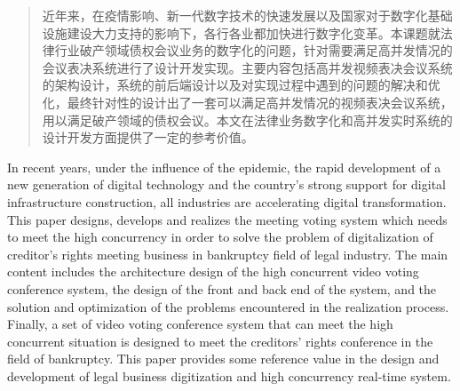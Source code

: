 
\begin{abstract}
  近年来，在疫情影响、新一代数字技术的快速发展以及国家对于数字化基础设施建设大力支持的影响下，各行各业都加快进行数字化变革。本课题就法律行业破产领域债权会议业务的数字化的问题，针对需要满足高并发情况的会议表决系统进行了设计开发实现。主要内容包括高并发视频表决会议系统的架构设计，系统的前后端设计以及对实现过程中遇到的问题的解决和优化，最终针对性的设计出了一套可以满足高并发情况的视频表决会议系统，用以满足破产领域的债权会议。本文在法律业务数字化和高并发实时系统的设计开发方面提供了一定的参考价值。
\end{abstract}

\begin{abstract*}
  In recent years, under the influence of the epidemic, the rapid development of a new generation of digital technology and the country's strong support for digital infrastructure construction, all industries are accelerating digital transformation. This paper designs, develops and realizes the meeting voting system which needs to meet the high concurrency in order to solve the problem of digitalization of creditor's rights meeting business in bankruptcy field of legal industry. The main content includes the architecture design of the high concurrent video voting conference system, the design of the front and back end of the system, and the solution and optimization of the problems encountered in the realization process. Finally, a set of video voting conference system that can meet the high concurrent situation is designed to meet the creditors' rights conference in the field of bankruptcy. This paper provides some reference value in the design and development of legal business digitization and high concurrency real-time system.
\end{abstract*}
